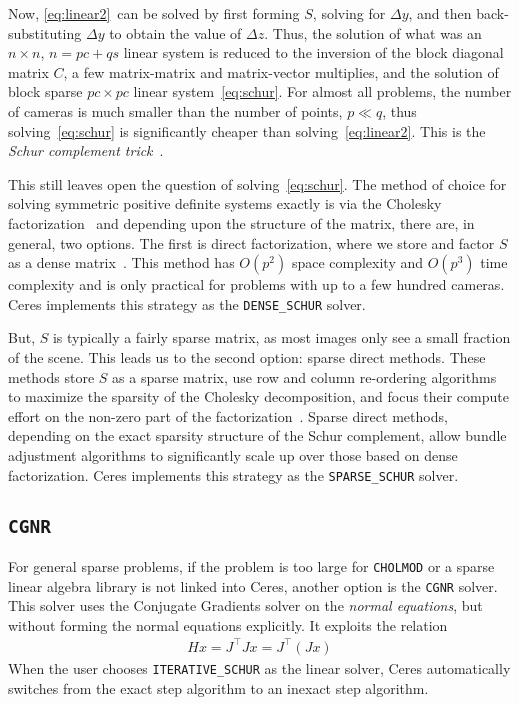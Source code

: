Now, \eqref{eq:linear2}~can  be solved by first forming $S$, solving for $\Delta y$, and then back-substituting $\Delta y$ to obtain the value of $\Delta z$.
Thus, the solution of what was an $n\times n$, $n=pc+qs$ linear system is reduced to the inversion of the block diagonal matrix $C$, a few matrix-matrix and matrix-vector multiplies, and the solution of block sparse $pc\times pc$ linear system~\eqref{eq:schur}.  For almost all  problems, the number of cameras is much smaller than the number of points, $p \ll q$, thus solving~\eqref{eq:schur} is significantly cheaper than solving~\eqref{eq:linear2}. This is the {\em Schur complement trick}~\cite{brown-58}.

This still leaves open the question of solving~\eqref{eq:schur}. The
method of choice for solving symmetric positive definite systems
exactly is via the Cholesky
factorization~\cite{trefethen1997numerical} and depending upon the
structure of the matrix, there are, in general, two options. The first
is direct factorization, where we store and factor $S$ as a dense
matrix~\cite{trefethen1997numerical}. This method has $O(p^2)$ space complexity and $O(p^3)$ time
complexity and is only practical for problems with up to a few hundred
cameras. Ceres implements this strategy as the \texttt{DENSE\_SCHUR} solver.


 But, $S$ is typically a fairly sparse matrix, as most images
only see a small fraction of the scene. This leads us to the second
option: sparse direct methods. These methods store $S$ as a sparse
matrix, use row and column re-ordering algorithms to maximize the
sparsity of the Cholesky decomposition, and focus their compute effort
on the non-zero part of the factorization~\cite{chen2006acs}.
Sparse direct methods, depending on the exact sparsity structure of the Schur complement,
allow bundle adjustment algorithms to significantly scale up over those based on dense
factorization. Ceres implements this strategy as the \texttt{SPARSE\_SCHUR} solver.

\subsection{\texttt{CGNR}}
For general sparse problems, if the problem is too large for \texttt{CHOLMOD} or a sparse linear algebra library is not linked into Ceres, another option is the \texttt{CGNR} solver. This solver uses the Conjugate Gradients solver on the {\em normal equations}, but without forming the normal equations explicitly. It exploits the relation
\begin{align}
    H x = J^\top J x = J^\top(J x)
\end{align}
When the user chooses \texttt{ITERATIVE\_SCHUR} as the linear solver, Ceres automatically switches from the exact step algorithm to an inexact step algorithm.

